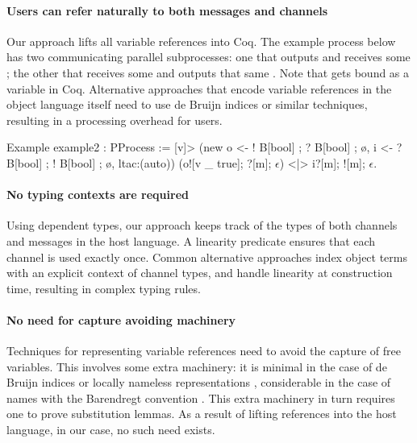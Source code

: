 \documentclass{mproj}
\begin{document}
\paragraph{Users can refer naturally to both messages and channels}

Our approach lifts all variable references into Coq. The example process below has two communicating parallel subprocesses: one that outputs  and receives some ; the other that receives some  and outputs that same . Note that  gets bound as a variable in Coq. Alternative approaches that encode variable references in the object language itself need to use de Bruijn indices \cite{deBruijn1972} or similar techniques, resulting in a processing overhead for users.
        
\begin{coq}
Example example2 : PProcess := [v]>
    (new o <- ! B[bool] ; ? B[bool] ; ø,
         i <- ? B[bool] ; ! B[bool] ; ø,
         ltac:(auto))
    (o![v _ true]; ?[m]; $\epsilon$) <|> i?[m]; ![m]; $\epsilon$.
\end{coq}

\paragraph{No typing contexts are required}

Using dependent types, our approach keeps track of the types of both channels and messages in the host language. A linearity predicate ensures that each channel is used exactly once. Common alternative approaches index object terms with an explicit context of channel types, and handle linearity at construction time, resulting in complex typing rules.

\paragraph{No need for capture avoiding machinery}

Techniques for representing variable references need to avoid the capture of free variables. This involves some extra machinery: it is minimal in the case of de Bruijn indices \cite{deBruijn1972} or locally nameless representations \cite{Chargueraud2012}, considerable in the case of names with the Barendregt convention \cite{Barendregt1984}. This extra machinery in turn requires one to prove substitution lemmas. As a result of lifting references into the host language, in our case, no such need exists.
\end{document}
